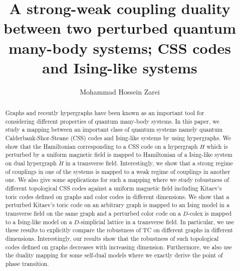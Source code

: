 \documentclass[preprintnumbers, showpacs, floatfix,twocolumn,
preprintnumbers, superscriptaddress]{revtex4}
\begin{document}
\title{A strong-weak coupling duality between two perturbed quantum many-body systems; CSS codes and Ising-like systems}
\author{Mohammad Hossein Zarei}

\begin{abstract}

Graphs and recently hypergraphs have been known as an important
tool for considering different properties of quantum many-body
systems. In this paper, we study a mapping between an important class of
quantum systems namely quantum Calderbank-Shor-Steane (CSS) codes
and Ising-like systems by using hypergraphs. We show that the
Hamiltonian corresponding to a CSS code on a hypergraph $H$ which is perturbed by a uniform magnetic field is mapped to Hamiltonian of a
Ising-like system on dual hypergraph $\tilde{H}$ in a transverse
field. Interestingly, we show that a strong regime of couplings in
one of the systems is mapped to a weak regime of couplings in
another one. We also give some applications for such a mapping where we study
robustness of different topological CSS codes against a uniform
magnetic field including Kitaev's toric codes defined on graphs and color codes in
different dimensions. We show that a perturbed Kitaev's toric code on an arbitrary graph is mapped to an Ising model in a transverse
field on the same graph and a perturbed color code on a $D$-colex
is mapped to a Ising-like model on a $D$-simplicial lattice in a
transverse field. In particular, we use these results to
explicitly compare the robustness of TC on different graphs in
different dimensions. Interestingly, our results show that the
robustness of such topological codes defined on graphs decreases with increasing
dimension. Furthermore, we also use the duality mapping for some
self-dual models where we exactly derive the point of phase
transition.
\end{abstract}


\maketitle
\end{document}
